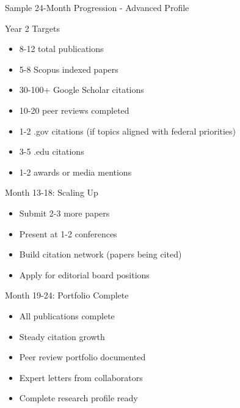 \documentclass[11pt]{beamer}
\begin{document}
				\begin{frame}{Sample 24-Month Progression - Advanced Profile}
					\scriptsize
					\begin{block}{Year 2 Targets}
						\begin{itemize}
							\item 8-12 total publications
							\item 5-8 Scopus indexed papers
							\item 30-100+ Google Scholar citations
							\item 10-20 peer reviews completed
							\item 1-2 .gov citations (if topics aligned with federal priorities)
							\item 3-5 .edu citations
							\item 1-2 awards or media mentions
						\end{itemize}
					\end{block}
					\begin{block}{Month 13-18: Scaling Up}
						\begin{itemize}
							\item Submit 2-3 more papers
							\item Present at 1-2 conferences
							\item Build citation network (papers being cited)
							\item Apply for editorial board positions
						\end{itemize}
					\end{block}
					\begin{block}{Month 19-24: Portfolio Complete}
						\begin{itemize}
							\item All publications complete
							\item Steady citation growth
							\item Peer review portfolio documented
							\item Expert letters from collaborators
							\item Complete research profile ready
						\end{itemize}
					\end{block}
				\end{frame}
				
\end{document}
